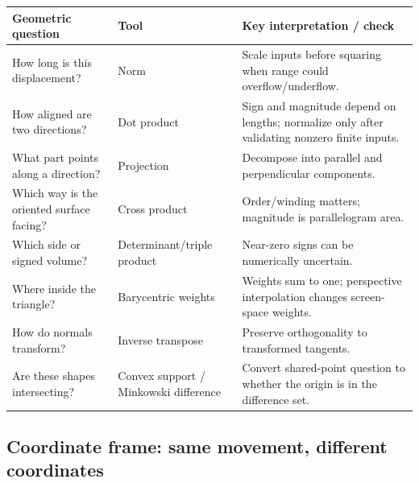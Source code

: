 {\def\LTcaptype{none} %
\begin{longtable}[]{@{}
  >{\raggedright\arraybackslash}p{}
  >{\raggedright\arraybackslash}p{}
  >{\raggedright\arraybackslash}p{}@{}}
\toprule\noalign{}
\begin{minipage}[b]{\linewidth}\raggedright
Geometric question
\end{minipage} & \begin{minipage}[b]{\linewidth}\raggedright
Tool
\end{minipage} & \begin{minipage}[b]{\linewidth}\raggedright
Key interpretation / check
\end{minipage} \\
\midrule\noalign{}
\endhead
\bottomrule\noalign{}
\endlastfoot
How long is this displacement? & Norm & Scale inputs before squaring when range could overflow/underflow. \\
How aligned are two directions? & Dot product & Sign and magnitude depend on lengths; normalize only after validating nonzero finite inputs. \\
What part points along a direction? & Projection & Decompose into parallel and perpendicular components. \\
Which way is the oriented surface facing? & Cross product & Order/winding matters; magnitude is parallelogram area. \\
Which side or signed volume? & Determinant/triple product & Near-zero signs can be numerically uncertain. \\
Where inside the triangle? & Barycentric weights & Weights sum to one; perspective interpolation changes screen-space weights. \\
How do normals transform? & Inverse transpose & Preserve orthogonality to transformed tangents. \\
Are these shapes intersecting? & Convex support / Minkowski difference & Convert shared-point question to whether the origin is in the difference set. \\
\end{longtable}
}

\subsection{Coordinate frame: same movement, different coordinates}\label{coordinate-frame-same-movement-different-coordinates}

